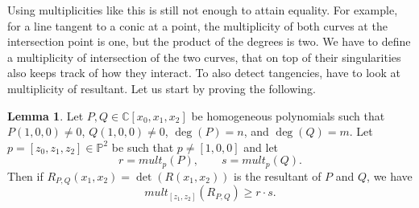 \documentclass{article}
\newcommand{\C}{\mathbb{C}}
\renewcommand{\P}{\mathbb{P}}
\newcommand{\rb}[1]{\left( #1 \right)}
\renewcommand{\sb}[1]{\left[ #1 \right]}
\theoremstyle{definition}\newtheorem{definition}{Definition}[section]
\theoremstyle{definition}\newtheorem{notation}[definition]{Notation}
\theoremstyle{definition}\newtheorem{remark}[definition]{Remark}
\theoremstyle{definition}\newtheorem{example1}[definition]{Example}
\theoremstyle{definition}\newtheorem{fact}{Fact}
\theoremstyle{definition}\newtheorem{exercise}{Exercise}
\theoremstyle{definition}\newtheorem*{example2}{Example}
\newtheorem{lemma}[definition]{Lemma}
\begin{document}
Using multiplicities like this is still not enough to attain equality. For example, for a line tangent to a conic at a point, the multiplicity of both curves at the intersection point is one, but the product of the degrees is two. We have to define a multiplicity of intersection of the two curves, that on top of their singularities also keeps track of how they interact. To also detect tangencies, have to look at multiplicity of resultant. Let us start by proving the following.

\begin{lemma}
\label{lem:11.7}
Let $ P, Q \in \C\sb{x_0, x_1, x_2} $ be homogeneous polynomials such that $ P\rb{1, 0, 0} \ne 0 $, $ Q\rb{1, 0, 0} \ne 0 $, $ \deg\rb{P} = n $, and $ \deg\rb{Q} = m $. Let $ p = \sb{z_0, z_1, z_2} \in \P^2 $ be such that $ p \ne \sb{1, 0, 0} $ and let
$$ r = mult_p\rb{P}, \qquad s = mult_p\rb{Q}. $$
Then if $ R_{P, Q}\rb{x_1, x_2} = \det\rb{R\rb{x_1, x_2}} $ is the resultant of $ P $ and $ Q $, we have
$$ mult_{\sb{z_1, z_2}}\rb{R_{P, Q}} \ge r \cdot s. $$
\end{lemma}
\end{document}
